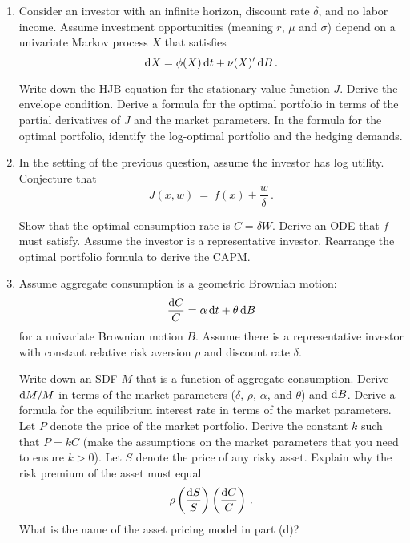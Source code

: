 \begin{enumerate}
\item Consider an investor with an infinite horizon, discount rate $\delta$, and no labor income.  Assume investment opportunities (meaning $r$, $\mu$ and $\sigma$) depend on a univariate Markov process $X$ that satisfies
$$\mathrm{d} X = \phi(X)\,\mathrm{d} t + \nu(X)'\,\mathrm{d} B\,.$$
\begin{enumerate}
\im Write down the HJB equation for the stationary value function $J$.
\im Derive the envelope condition.
\im Derive a formula for the optimal portfolio in terms of the partial derivatives of $J$ and the market parameters.  
\im In the formula for the optimal portfolio, identify the log-optimal portfolio and the hedging demands.
\end{enumerate} 


\newpage\item In the setting of the previous question, assume the investor has log utility.  Conjecture that
$$J(x,w) \ = \ f(x) + \frac{w}{\delta}\,.$$
\begin{enumerate}
\im Show that the optimal consumption rate is $C = \delta W$.
\im Derive an ODE that $f$ must satisfy.
\im Assume the investor is a representative investor.  Rearrange the optimal portfolio formula to derive the CAPM.
\end{enumerate}


\newpage\item Assume aggregate consumption is a geometric Brownian motion:
$$\frac{\mathrm{d} C}{C} = \alpha\,\mathrm{d} t + \theta\,\mathrm{d} B$$
for a univariate Brownian motion $B$.  Assume there is a representative investor with constant relative risk aversion $\rho$ and discount rate $\delta$.  
\begin{enumerate}
\im Write down an SDF $M$ that is a function of aggregate consumption.  Derive $\mathrm{d} M/M$ in terms of the market parameters ($\delta$, $\rho$, $\alpha$, and $\theta$) and $\mathrm{d} B$.
\im Derive a formula for the equilibrium interest rate in terms of the market parameters.
\im Let $P$ denote the price of the market portfolio.  Derive the constant $k$ such that $P=kC$ (make the assumptions on the market parameters that you need to ensure $k>0$). 
\im Let $S$ denote the price of any risky asset.  Explain why the risk premium of the asset must equal
$$\rho \left(\frac{\mathrm{d} S}{S}\right)\left(\frac{\mathrm{d} C}{C}\right)\,.$$
\im What is the name of the asset pricing model in part (d)?
\end{enumerate}


\end{enumerate}
